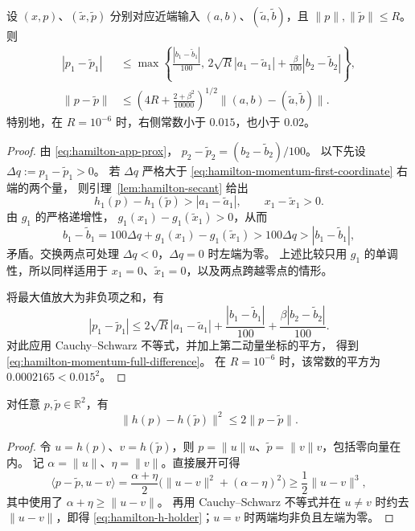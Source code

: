 \begin{lemma}[近端输出动量的两点估计]
\label{lem:hamilton-momentum-difference}
设 $(x,p)$、$(\widetilde x,\widetilde p)$ 分别对应近端输入
$(a,b)$、$(\widetilde a,\widetilde b)$，且
$\|p\|,\|\widetilde p\|\leq R$。则
\begin{align}
\label{eq:hamilton-momentum-first-coordinate}
 |p_1-\widetilde p_1|
 &\leq\max\left\{
       \frac{|b_1-\widetilde b_1|}{100},\,
       2\sqrt R|a_1-\widetilde a_1|
       +\frac{\beta}{100}|b_2-\widetilde b_2|
      \right\},\\
\label{eq:hamilton-momentum-full-difference}
 \|p-\widetilde p\|
 &\leq\left(4R+\frac{2+\beta^2}{10000}\right)^{1/2}
       \|(a,b)-(\widetilde a,\widetilde b)\|.
\end{align}
特别地，在 $R=10^{-6}$ 时，右侧常数小于 $0.015$，也小于 $0.02$。
\end{lemma}

\begin{proof}
由 \eqref{eq:hamilton-app-prox}，
$p_2-\widetilde p_2=(b_2-\widetilde b_2)/100$。
以下先设 $\Delta q:=p_1-\widetilde p_1>0$。
若 $\Delta q$ 严格大于
\eqref{eq:hamilton-momentum-first-coordinate} 右端的两个量，
则引理~\ref{lem:hamilton-secant} 给出
\[
 h_1(p)-h_1(\widetilde p)>|a_1-\widetilde a_1|,
 \qquad x_1-\widetilde x_1>0.
\]
由 $g_1$ 的严格递增性，
$g_1(x_1)-g_1(\widetilde x_1)>0$，从而
\[
 b_1-\widetilde b_1
 =100\Delta q+g_1(x_1)-g_1(\widetilde x_1)
 >100\Delta q>|b_1-\widetilde b_1|,
\]
矛盾。交换两点可处理 $\Delta q<0$，$\Delta q=0$ 时左端为零。
上述比较只用 $g_1$ 的单调性，所以同样适用于
$x_1=0$、$\widetilde x_1=0$，以及两点跨越零点的情形。

将最大值放大为非负项之和，有
\[
 |p_1-\widetilde p_1|
 \leq2\sqrt R|a_1-\widetilde a_1|
       +\frac{|b_1-\widetilde b_1|}{100}
       +\frac{\beta|b_2-\widetilde b_2|}{100}.
\]
对此应用 Cauchy--Schwarz 不等式，并加上第二动量坐标的平方，
得到 \eqref{eq:hamilton-momentum-full-difference}。
在 $R=10^{-6}$ 时，该常数的平方为 $0.0002165<0.015^2$。
\end{proof}

\begin{lemma}
\label{lem:hamilton-h-holder}
对任意 $p,\widetilde p\in\mathbb R^2$，有
\begin{equation}
\label{eq:hamilton-h-holder}
 \|h(p)-h(\widetilde p)\|^2\leq2\|p-\widetilde p\|.
\end{equation}
\end{lemma}

\begin{proof}
令 $u=h(p)$、$v=h(\widetilde p)$，则
$p=\|u\|u$、$\widetilde p=\|v\|v$，包括零向量在内。
记 $\alpha=\|u\|$、$\eta=\|v\|$。直接展开可得
\[
 \langle p-\widetilde p,u-v\rangle
 =\frac{\alpha+\eta}{2}
   \bigl(\|u-v\|^2+(\alpha-\eta)^2\bigr)
 \geq\frac12\|u-v\|^3,
\]
其中使用了 $\alpha+\eta\geq\|u-v\|$。
再用 Cauchy--Schwarz 不等式并在 $u\ne v$ 时约去
$\|u-v\|$，即得 \eqref{eq:hamilton-h-holder}；$u=v$ 时两端均非负且左端为零。
\end{proof}

